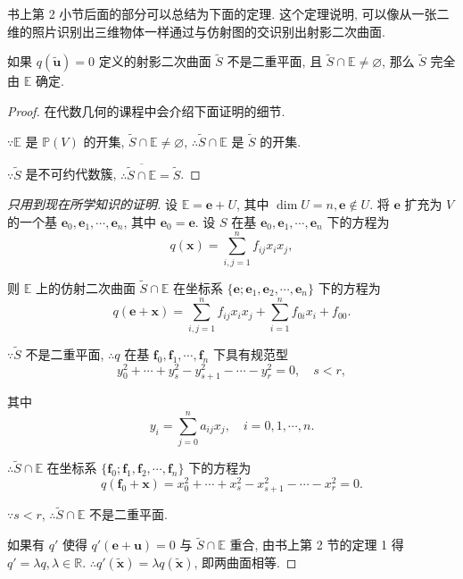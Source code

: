 \documentclass[color=black,device=normal,lang=cn,mode=geye]{elegantnote}
\begin{document}
书上第 2 小节后面的部分可以总结为下面的定理. 这个定理说明, 可以像从一张二维的照片识别出三维物体一样通过与仿射图的交识别出射影二次曲面.
\begin{theorem}
    如果 $q(\tilde{\boldsymbol{u}})=0$ 定义的射影二次曲面 $\tilde{S}$ 不是二重平面, 且 $\tilde{S}\cap\mathbb{E}\neq\varnothing$, 那么 $\tilde{S}$ 完全由 $\mathbb{E}$ 确定.
\end{theorem}
\begin{proof}
    在代数几何的课程中会介绍下面证明的细节.

    $\because\mathbb{E}$ 是 $\mathbb{P}(V)$ 的开集, $\tilde{S}\cap\mathbb{E}\neq\varnothing$, $\therefore \tilde{S}\cap\mathbb{E}$ 是 $\tilde{S}$ 的开集.

    $\because \tilde{S}$ 是不可约代数簇, $\therefore\overline{\tilde{S}\cap\mathbb{E}}=\tilde{S}$.
\end{proof}
\begin{proof}[只用到现在所学知识的证明]
    设 $\mathbb{E}=\boldsymbol{e}+U$, 其中 $\dim U=n,\boldsymbol{e}\notin U$. 将 $\boldsymbol{e}$ 扩充为 $V$ 的一个基 $\boldsymbol{e}_0,\boldsymbol{e}_1,\cdots,\boldsymbol{e}_n$, 其中 $\boldsymbol{e}_0=\boldsymbol{e}$. 设 $S$ 在基 $\boldsymbol{e}_0,\boldsymbol{e}_1,\cdots,\boldsymbol{e}_n$ 下的方程为
    \[q(\boldsymbol{x})=\sum\limits_{i,j=1}^nf_{ij}x_ix_j,\]

    则 $\mathbb{E}$ 上的仿射二次曲面 $\tilde{S}\cap\mathbb{E}$ 在坐标系 $\{\boldsymbol{e};\boldsymbol{e}_1,\boldsymbol{e}_2,\cdots,\boldsymbol{e}_n\}$ 下的方程为
    \[q(\boldsymbol{e}+\boldsymbol{x})=\sum\limits_{i,j=1}^nf_{ij}x_ix_j+\sum\limits_{i=1}^nf_{0i}x_i+f_{00}.\]

    $\because\tilde{S}$ 不是二重平面, $\therefore q$ 在基 $\boldsymbol{f}_0,\boldsymbol{f}_1,\cdots,\boldsymbol{f}_n$ 下具有规范型
    \[y^2_0+\cdots+y^2_s-y^2_{s+1}-\cdots-y^2_r=0,\quad s<r,\]

    其中
    \[y_i=\sum\limits_{j=0}^na_{ij}x_j,\quad i=0,1,\cdots,n.\]

    $\therefore\tilde{S}\cap\mathbb{E}$ 在坐标系 $\{\boldsymbol{f}_0;\boldsymbol{f}_1,\boldsymbol{f}_2,\cdots,\boldsymbol{f}_n\}$ 下的方程为
    \[q(\boldsymbol{f}_0+\boldsymbol{x})=x^2_0+\cdots+x^2_s-x^2_{s+1}-\cdots-x^2_r=0.\]

    $\because s<r$, $\therefore\tilde{S}\cap\mathbb{E}$ 不是二重平面.

    如果有 $q'$ 使得 $q'(\boldsymbol{e}+\boldsymbol{u})=0$ 与 $\tilde{S}\cap\mathbb{E}$ 重合, 由书上第 2 节的定理 1 得 $q'=\lambda q,\lambda\in\mathbb{R}$. $\therefore q'(\tilde{\boldsymbol{x}})=\lambda q(\tilde{\boldsymbol{x}})$, 即两曲面相等.
\end{proof}
\end{document}
